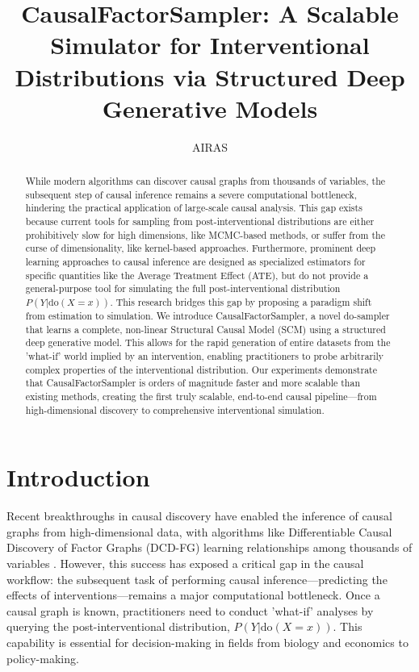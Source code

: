 \documentclass{article} %
\title{CausalFactorSampler: A Scalable Simulator for Interventional Distributions via Structured Deep Generative Models}
\author{AIRAS}
\begin{document}
\maketitle

\begin{abstract}
While modern algorithms can discover causal graphs from thousands of variables, the subsequent step of causal inference remains a severe computational bottleneck, hindering the practical application of large-scale causal analysis. This gap exists because current tools for sampling from post-interventional distributions are either prohibitively slow for high dimensions, like MCMC-based methods, or suffer from the curse of dimensionality, like kernel-based approaches. Furthermore, prominent deep learning approaches to causal inference are designed as specialized estimators for specific quantities like the Average Treatment Effect (ATE), but do not provide a general-purpose tool for simulating the full post-interventional distribution $P(Y|\mathrm{do}(X=x))$. This research bridges this gap by proposing a paradigm shift from estimation to simulation. We introduce CausalFactorSampler, a novel do-sampler that learns a complete, non-linear Structural Causal Model (SCM) using a structured deep generative model. This allows for the rapid generation of entire datasets from the 'what-if' world implied by an intervention, enabling practitioners to probe arbitrarily complex properties of the interventional distribution. Our experiments demonstrate that CausalFactorSampler is orders of magnitude faster and more scalable than existing methods, creating the first truly scalable, end-to-end causal pipeline—from high-dimensional discovery to comprehensive interventional simulation.
\end{abstract}

\section{Introduction}
\label{sec:intro}
Recent breakthroughs in causal discovery have enabled the inference of causal graphs from high-dimensional data, with algorithms like Differentiable Causal Discovery of Factor Graphs (DCD-FG) learning relationships among thousands of variables \cite{lopez_2022_large}. However, this success has exposed a critical gap in the causal workflow: the subsequent task of performing causal inference—predicting the effects of interventions—remains a major computational bottleneck. Once a causal graph is known, practitioners need to conduct 'what-if' analyses by querying the post-interventional distribution, $P(Y|\mathrm{do}(X=x))$. This capability is essential for decision-making in fields from biology and economics to policy-making.
\end{document}
